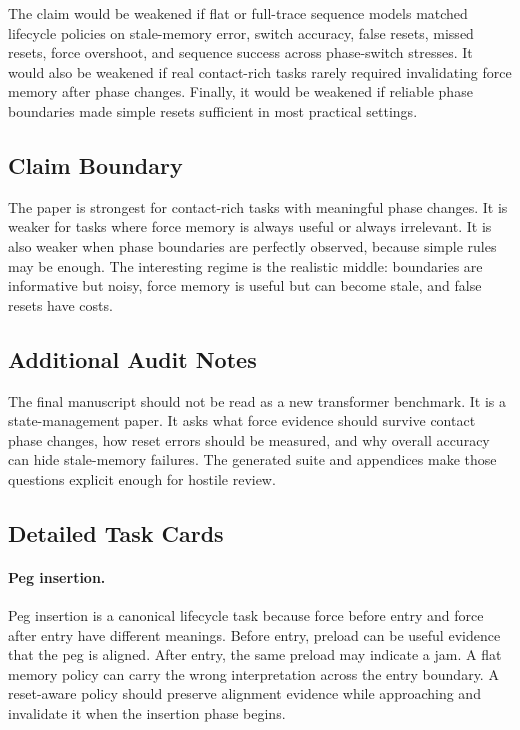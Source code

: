 \documentclass{article}
\begin{document}
The claim would be weakened if flat or full-trace sequence models matched
lifecycle policies on stale-memory error, switch accuracy, false resets, missed
resets, force overshoot, and sequence success across phase-switch stresses. It
would also be weakened if real contact-rich tasks rarely required invalidating
force memory after phase changes. Finally, it would be weakened if reliable
phase boundaries made simple resets sufficient in most practical settings.

\subsection{Claim Boundary}

The paper is strongest for contact-rich tasks with meaningful phase changes. It
is weaker for tasks where force memory is always useful or always irrelevant.
It is also weaker when phase boundaries are perfectly observed, because simple
rules may be enough. The interesting regime is the realistic middle: boundaries
are informative but noisy, force memory is useful but can become stale, and
false resets have costs.

\subsection{Additional Audit Notes}

The final manuscript should not be read as a new transformer benchmark. It is a
state-management paper. It asks what force evidence should survive contact
phase changes, how reset errors should be measured, and why overall accuracy
can hide stale-memory failures. The generated suite and appendices make those
questions explicit enough for hostile review.

\subsection{Detailed Task Cards}

\paragraph{Peg insertion.}
Peg insertion is a canonical lifecycle task because force before entry and
force after entry have different meanings. Before entry, preload can be useful
evidence that the peg is aligned. After entry, the same preload may indicate a
jam. A flat memory policy can carry the wrong interpretation across the entry
boundary. A reset-aware policy should preserve alignment evidence while
approaching and invalidate it when the insertion phase begins.
\end{document}
